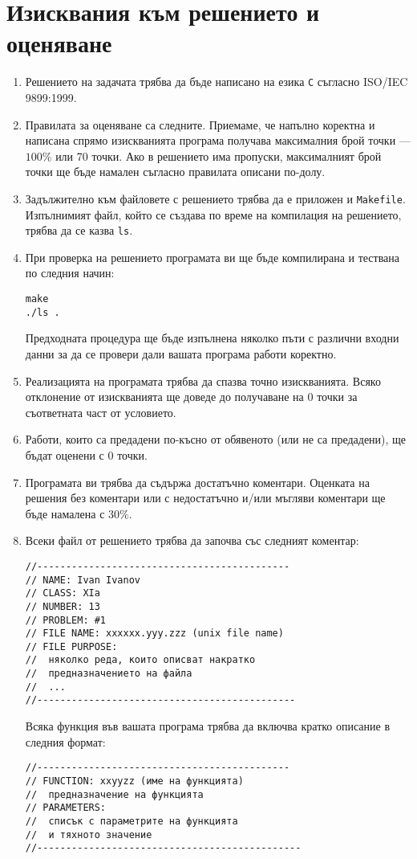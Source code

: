 \documentclass[a4paper,10pt]{article}
\begin{document}
\section{Изисквания към решението и оценяване}
\begin{enumerate}

\item Решението на задачата трябва да бъде написано на езика \lstinline{C} съгласно ISO/IEC 9899:1999.

\item Правилата за оценяване са следните. Приемаме, че напълно коректна и написана спрямо изискванията програма получава максималния брой точки — $100\%$ или 70 точки. Ако в решението има пропуски, максималният брой точки ще бъде намален съгласно правилата описани по-долу.

\item Задължително към файловете с решението трябва да е приложен и \lstinline{Makefile}. Изпълнимият файл, който се създава по време на компилация на решението, трябва да се казва \lstinline{ls}.

\item При проверка на решението програмата ви ще бъде компилирана и тествана по следния начин:
\begin{lstlisting}
make
./ls .
\end{lstlisting}
Предходната процедура ще бъде изпълнена няколко пъти с различни входни данни за да се провери дали вашата програма работи коректно.

\item Реализацията на програмата трябва да спазва точно изискванията. Всяко отклонение от изискванията ще доведе до получаване на 0 точки за съответната част от условието.

\item Работи, които са предадени по-късно от обявеното (или не са предадени), ще бъдат оценени с 0 точки.


\item Програмата ви трябва да съдържа достатъчно коментари. Оценката на решения без коментари или с недостатъчно и/или мъгляви коментари ще бъде намалена с $30\%$.

\item Всеки файл от решението трябва да започва със следният коментар:
\begin{verbatim}
//--------------------------------------------
// NAME: Ivan Ivanov
// CLASS: XIa
// NUMBER: 13
// PROBLEM: #1
// FILE NAME: xxxxxx.yyy.zzz (unix file name)
// FILE PURPOSE:
// 	няколко реда, които описват накратко
// 	предназначението на файла
// 	...
//--------------------------------------------- 
\end{verbatim}
Всяка функция във вашата програма трябва да включва кратко описание в следния формат:
\begin{verbatim}
//--------------------------------------------
// FUNCTION: xxyyzz (име на функцията)
// 	предназначение на функцията
// PARAMETERS:
// 	списък с параметрите на функцията
// 	и тяхното значение
//----------------------------------------------
\end{verbatim}


\end{enumerate}
\end{document}
